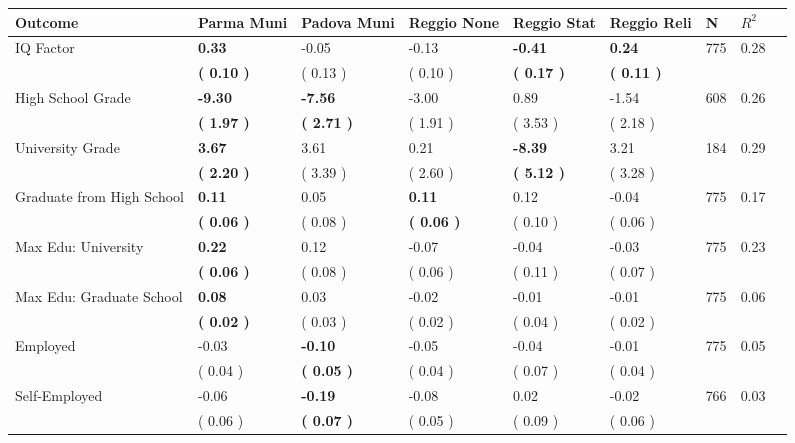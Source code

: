 \begin{tabular}{L{6.2cm} C{1.8cm} C{1.8cm} C{1.8cm} C{1.8cm} C{1.8cm} C{1.8cm} C{0.3cm} C{0.3cm}}
\toprule
 \textbf{Outcome} & \textbf{Parma Muni} & \textbf{Padova Muni} & \textbf{Reggio None} & \textbf{Reggio Stat} & \textbf{Reggio Reli} & \textbf{N} & \textbf{$ R^2$} \\
\midrule
IQ Factor & \textbf{     0.33} &     -0.05 &     -0.13 & \textbf{    -0.41} & \textbf{     0.24}  & 775 &       0.28 \\ 
 & \textbf{(     0.10 )} & (     0.13 ) & (     0.10 ) & \textbf{(     0.17 )} & \textbf{(     0.11 )}  & \\
High School Grade & \textbf{    -9.30} & \textbf{    -7.56} &     -3.00 &      0.89 &     -1.54  & 608 &       0.26 \\ 
 & \textbf{(     1.97 )} & \textbf{(     2.71 )} & (     1.91 ) & (     3.53 ) & (     2.18 )  & \\
University Grade & \textbf{     3.67} &      3.61 &      0.21 & \textbf{    -8.39} &      3.21  & 184 &       0.29 \\ 
 & \textbf{(     2.20 )} & (     3.39 ) & (     2.60 ) & \textbf{(     5.12 )} & (     3.28 )  & \\
Graduate from High School & \textbf{     0.11} &      0.05 & \textbf{     0.11} &      0.12 &     -0.04  & 775 &       0.17 \\ 
 & \textbf{(     0.06 )} & (     0.08 ) & \textbf{(     0.06 )} & (     0.10 ) & (     0.06 )  & \\
Max Edu: University & \textbf{     0.22} &      0.12 &     -0.07 &     -0.04 &     -0.03  & 775 &       0.23 \\ 
 & \textbf{(     0.06 )} & (     0.08 ) & (     0.06 ) & (     0.11 ) & (     0.07 )  & \\
Max Edu: Graduate School & \textbf{     0.08} &      0.03 &     -0.02 &     -0.01 &     -0.01  & 775 &       0.06 \\ 
 & \textbf{(     0.02 )} & (     0.03 ) & (     0.02 ) & (     0.04 ) & (     0.02 )  & \\
Employed &     -0.03 & \textbf{    -0.10} &     -0.05 &     -0.04 &     -0.01  & 775 &       0.05 \\ 
 & (     0.04 ) & \textbf{(     0.05 )} & (     0.04 ) & (     0.07 ) & (     0.04 )  & \\
Self-Employed &     -0.06 & \textbf{    -0.19} &     -0.08 &      0.02 &     -0.02  & 766 &       0.03 \\ 
 & (     0.06 ) & \textbf{(     0.07 )} & (     0.05 ) & (     0.09 ) & (     0.06 )  & \\

\end{tabular}
